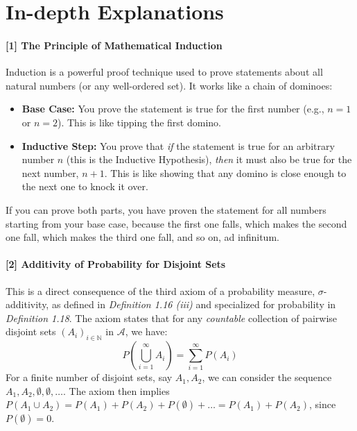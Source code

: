 \documentclass[11pt,a4paper]{article}
\begin{document}
\section*{In-depth Explanations}

\hypertarget{note:induction}{\label{note:induction}}
\paragraph{[1] The Principle of Mathematical Induction}
Induction is a powerful proof technique used to prove statements about all natural numbers (or any well-ordered set). It works like a chain of dominoes:
\begin{itemize}
    \item \textbf{Base Case:} You prove the statement is true for the first number (e.g., $n=1$ or $n=2$). This is like tipping the first domino.
    \item \textbf{Inductive Step:} You prove that \textit{if} the statement is true for an arbitrary number $n$ (this is the Inductive Hypothesis), \textit{then} it must also be true for the next number, $n+1$. This is like showing that any domino is close enough to the next one to knock it over.
\end{itemize}
If you can prove both parts, you have proven the statement for all numbers starting from your base case, because the first one falls, which makes the second one fall, which makes the third one fall, and so on, ad infinitum.

\vspace{1cm}
\hypertarget{note:additivity}{\label{note:additivity}}
\paragraph{[2] Additivity of Probability for Disjoint Sets}
This is a direct consequence of the third axiom of a probability measure, $\sigma$-additivity, as defined in \textit{Definition 1.16 (iii)} and specialized for probability in \textit{Definition 1.18}. The axiom states that for any \textit{countable} collection of pairwise disjoint sets $(A_i)_{i \in \mathbb{N}}$ in $\mathcal{A}$, we have:
$$ P\left(\bigcup_{i=1}^\infty A_i\right) = \sum_{i=1}^\infty P(A_i) $$
For a finite number of disjoint sets, say $A_1, A_2$, we can consider the sequence $A_1, A_2, \emptyset, \emptyset, \dots$. The axiom then implies $P(A_1 \cup A_2) = P(A_1) + P(A_2) + P(\emptyset) + \dots = P(A_1) + P(A_2)$, since $P(\emptyset)=0$.

\vspace{1cm}
\hypertarget{note:difference}{\label{note:difference}}
\end{document}
